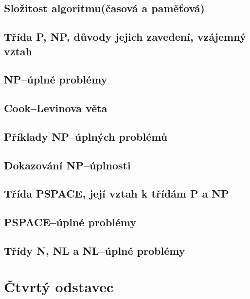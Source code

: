 \documentclass[10pt,a4paper]{article}
\begin{document}
	\subsection{Složitost algoritmu(časová a paměťová)}

	\subsection{Třída P, NP, důvody jejich zavedení, vzájemný vztah}

	\subsection{NP--úplné problémy}

	\subsection{Cook--Levinova věta}

	\subsection{Příklady NP--úplných problémů}

	\subsection{Dokazování NP--úplnosti}

	\subsection{Třída PSPACE, její vztah k třídám P a NP}

	\subsection{PSPACE--úplné problémy}

	\subsection{Třídy N, NL a NL--úplné problémy}



\section{Čtvrtý odstavec}
\end{document}
